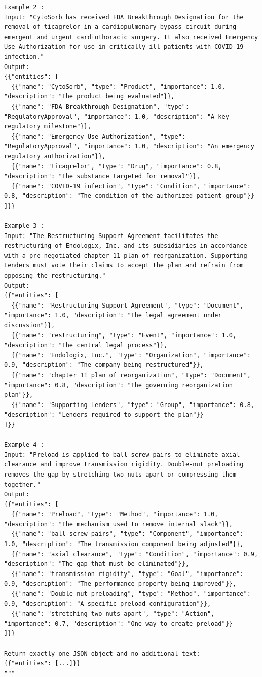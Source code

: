 \documentclass[a4paper,fleqn]{cas-dc}
\begin{document}
\begin{lstlisting}
Example 2 :
Input: "CytoSorb has received FDA Breakthrough Designation for the removal of ticagrelor in a cardiopulmonary bypass circuit during emergent and urgent cardiothoracic surgery. It also received Emergency Use Authorization for use in critically ill patients with COVID-19 infection."
Output:
{{"entities": [
  {{"name": "CytoSorb", "type": "Product", "importance": 1.0, "description": "The product being evaluated"}},
  {{"name": "FDA Breakthrough Designation", "type": "RegulatoryApproval", "importance": 1.0, "description": "A key regulatory milestone"}},
  {{"name": "Emergency Use Authorization", "type": "RegulatoryApproval", "importance": 1.0, "description": "An emergency regulatory authorization"}},
  {{"name": "ticagrelor", "type": "Drug", "importance": 0.8, "description": "The substance targeted for removal"}},
  {{"name": "COVID-19 infection", "type": "Condition", "importance": 0.8, "description": "The condition of the authorized patient group"}}
]}}

Example 3 :
Input: "The Restructuring Support Agreement facilitates the restructuring of Endologix, Inc. and its subsidiaries in accordance with a pre-negotiated chapter 11 plan of reorganization. Supporting Lenders must vote their claims to accept the plan and refrain from opposing the restructuring."
Output:
{{"entities": [
  {{"name": "Restructuring Support Agreement", "type": "Document", "importance": 1.0, "description": "The legal agreement under discussion"}},
  {{"name": "restructuring", "type": "Event", "importance": 1.0, "description": "The central legal process"}},
  {{"name": "Endologix, Inc.", "type": "Organization", "importance": 0.9, "description": "The company being restructured"}},
  {{"name": "chapter 11 plan of reorganization", "type": "Document", "importance": 0.8, "description": "The governing reorganization plan"}},
  {{"name": "Supporting Lenders", "type": "Group", "importance": 0.8, "description": "Lenders required to support the plan"}}
]}}

Example 4 :
Input: "Preload is applied to ball screw pairs to eliminate axial clearance and improve transmission rigidity. Double-nut preloading removes the gap by stretching two nuts apart or compressing them together."
Output:
{{"entities": [
  {{"name": "Preload", "type": "Method", "importance": 1.0, "description": "The mechanism used to remove internal slack"}},
  {{"name": "ball screw pairs", "type": "Component", "importance": 1.0, "description": "The transmission component being adjusted"}},
  {{"name": "axial clearance", "type": "Condition", "importance": 0.9, "description": "The gap that must be eliminated"}},
  {{"name": "transmission rigidity", "type": "Goal", "importance": 0.9, "description": "The performance property being improved"}},
  {{"name": "Double-nut preloading", "type": "Method", "importance": 0.9, "description": "A specific preload configuration"}},
  {{"name": "stretching two nuts apart", "type": "Action", "importance": 0.7, "description": "One way to create preload"}}
]}}

Return exactly one JSON object and no additional text:
{{"entities": [...]}}
"""
\end{lstlisting}
\end{document}
